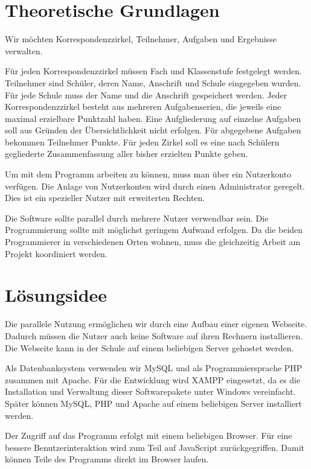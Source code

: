 \chapter{Theoretische Grundlagen}

Wir möchten Korrespondenzzirkel, Teilnehmer, Aufgaben und Ergebnisse verwalten.

Für jeden Korrespondenzzirkel müssen Fach und Klassenstufe festgelegt werden. 
Teilnehmer sind Schüler, deren Name, Anschrift und Schule eingegeben wurden. Für jede Schule muss der Name und die Anschrift gespeichert werden. 
Jeder Korrespondenzzirkel besteht aus mehreren Aufgabenserien, die jeweils eine maximal erzielbare Punktzahl haben. Eine Aufgliederung auf einzelne Aufgaben soll aus Gründen der Übersichtlichkeit nicht erfolgen.
Für abgegebene Aufgaben bekommen Teilnehmer Punkte. Für jeden Zirkel soll es eine nach Schülern gegliederte Zusammenfassung aller bisher erzielten Punkte geben.

Um mit dem Programm arbeiten zu können, muss man über ein Nutzerkonto verfügen. Die Anlage von Nutzerkonten wird durch einen Administrator geregelt. Dies ist ein spezieller Nutzer mit erweiterten Rechten.

Die Software sollte parallel durch mehrere Nutzer verwendbar sein.
Die Programmierung sollte mit möglichst geringem Aufwand erfolgen.
Da die beiden Programmierer in verschiedenen Orten wohnen, muss die gleichzeitig Arbeit am Projekt koordiniert werden.

\chapter{Lösungsidee}

Die parallele Nutzung ermöglichen wir durch eine Aufbau einer eigenen Webseite. Dadurch müssen die Nutzer auch keine Software auf ihren Rechnern installieren. Die Webseite kann in der Schule auf einem beliebigen Server gehostet werden. 

Als Datenbanksystem verwenden wir MySQL und als Programmiersprache PHP zusammen mit Apache. Für die Entwicklung wird XAMPP eingesetzt, da es die Installation und Verwaltung dieser Softwarepakete unter Windows vereinfacht. Später können MySQL, PHP und Apache auf einem beliebigen Server installiert werden. \cite{Xampp}

Der Zugriff auf das Programm erfolgt mit einem beliebigen Browser. Für eine bessere Benutzerinteraktion wird zum Teil auf JavaScript zurückgegriffen. Damit können Teile des Programms direkt im Browser laufen.

